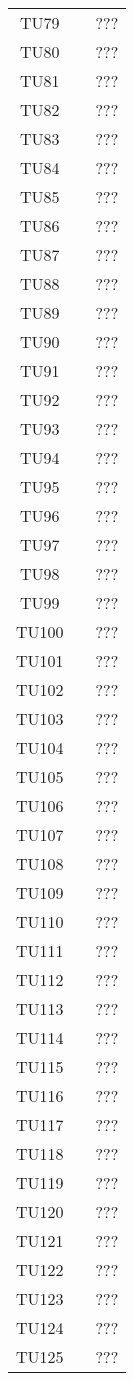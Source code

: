 {\begin{longtable}{ c  C{8.5cm} C{3cm}}
TU79 &  & ??? \\
TU80 &  & ??? \\
TU81 &  & ??? \\
TU82 &  & ??? \\
TU83 &  & ??? \\
TU84 &  & ??? \\
TU85 &  & ??? \\
TU86 &  & ??? \\
TU87 &  & ??? \\
TU88 &  & ??? \\
TU89 &  & ??? \\
TU90 &  & ??? \\
TU91 &  & ??? \\
TU92 &  & ??? \\
TU93 &  & ??? \\
TU94 &  & ??? \\
TU95 &  & ??? \\
TU96 &  & ??? \\
TU97 &  & ??? \\
TU98 &  & ??? \\
TU99 &  & ??? \\
TU100 &  & ??? \\
TU101 &  & ??? \\
TU102 &  & ??? \\
TU103 &  & ??? \\
TU104 &  & ??? \\
TU105 &  & ??? \\
TU106 &  & ??? \\
TU107 &  & ??? \\
TU108 &  & ??? \\
TU109 &  & ??? \\
TU110 &  & ??? \\
TU111 &  & ??? \\
TU112 &  & ??? \\
TU113 &  & ??? \\
TU114 &  & ??? \\
TU115 &  & ??? \\
TU116 &  & ??? \\
TU117 &  & ??? \\
TU118 &  & ??? \\
TU119 &  & ??? \\
TU120 &  & ??? \\
TU121 &  & ??? \\
TU122 &  & ??? \\
TU123 &  & ??? \\
TU124 &  & ??? \\
TU125 &  & ??? \\
\end{longtable}
}